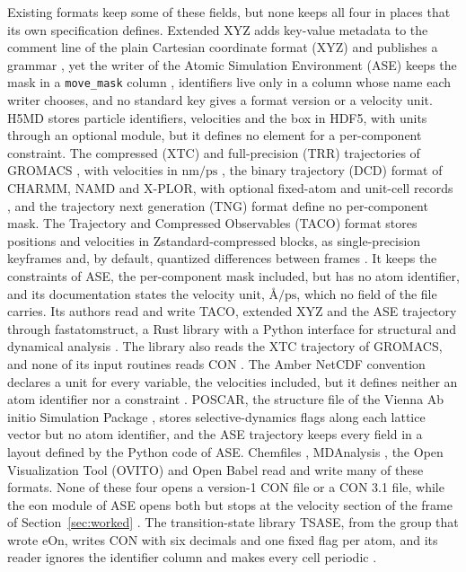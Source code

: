 \documentclass[preprint,12pt]{elsarticle}
\begin{document}
Existing formats keep some of these fields, but none keeps all four in places that its own specification defines.
Extended XYZ adds key-value metadata to the comment line of the plain Cartesian coordinate format (XYZ) and publishes a grammar \cite{kermodeLibatomsExtxyzV0462026}, yet the writer of the Atomic Simulation Environment (ASE) keeps the mask in a \texttt{move\_mask} column \cite{aseSource3290}, identifiers live only in a column whose name each writer chooses, and no standard key gives a format version or a velocity unit.
H5MD \cite{buylH5mdStructuredEfficient2014,folkOverviewHdf5Technology2011} stores particle identifiers, velocities and the box in HDF5, with units through an optional module, but it defines no element for a per-component constraint.
The compressed (XTC) and full-precision (TRR) trajectories of GROMACS \cite{gromacsFileFormats2026}, with velocities in \(\mathrm{nm}/\mathrm{ps}\) \cite{gromacsDefinitionsUnits2026}, the binary trajectory (DCD) format of CHARMM, NAMD and X-PLOR, with optional fixed-atom and unit-cell records \cite{vmdDcdPlugin2026}, and the trajectory next generation (TNG) format \cite{spangbergTrajectoryNgPortable2011,lundborgEfficientExtensibleFormat2014} define no per-component mask.
The Trajectory and Compressed Observables (TACO) format stores positions and velocities in Zstandard-compressed blocks, as single-precision keyframes and, by default, quantized differences between frames \cite{holleTacoFormat0502026,holleTacoFormatSpec2026}.
It keeps the constraints of ASE, the per-component mask included, but has no atom identifier, and its documentation states the velocity unit, \(\text{\AA}/\mathrm{ps}\), which no field of the file carries.
Its authors read and write TACO, extended XYZ and the ASE trajectory through fastatomstruct, a Rust library with a Python interface for structural and dynamical analysis \cite{holleFastatomstructHighperformanceLibrary2025,holleFastatomstructRelease2302026}.
The library also reads the XTC trajectory of GROMACS, and none of its input routines reads CON \cite{holleFastatomstructRelease2302026}.
The Amber NetCDF convention declares a unit for every variable, the velocities included, but it defines neither an atom identifier nor a constraint \cite{amberNetcdfConvention2022}.
POSCAR, the structure file of the Vienna Ab initio Simulation Package \cite{vaspwikiPoscar2026,kresseEfficiencyAbinitioTotal1996}, stores selective-dynamics flags along each lattice vector but no atom identifier, and the ASE trajectory keeps every field in a layout defined by the Python code of ASE.
Chemfiles \cite{frauxChemfileschemfilesVersion01042023}, MDAnalysis \cite{michaudAgrawalMDAnalysisToolkit2011,gowersMdanalysisPythonPackage2016}, the Open Visualization Tool (OVITO) \cite{stukowskiVisualizationAnalysisAtomistic2010} and Open Babel \cite{oboyleOpenBabelOpen2011} read and write many of these formats.
None of these four opens a version-1 CON file or a CON 3.1 file, while the eon module of ASE opens both but stops at the velocity section of the frame of Section~\ref{sec:worked} \cite{aseSource3290}.
The transition-state library TSASE, from the group that wrote eOn, writes CON with six decimals and one fixed flag per atom, and its reader ignores the identifier column and makes every cell periodic \cite{terrellTsaseTransitionStateLibrary2025}.
\end{document}

